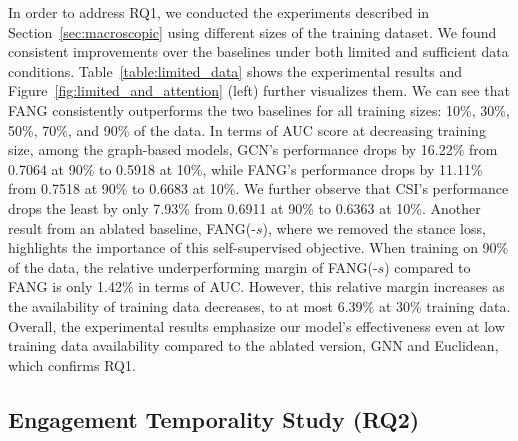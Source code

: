 \documentclass[sigconf]{acmart}
\theoremstyle{definition}
\theoremstyle{hypothesis}
\begin{document}
In order to address RQ1, we conducted the experiments described in Section~\ref{sec:macroscopic} using different sizes of the training dataset. We found consistent improvements over the baselines under both limited and sufficient data conditions.
Table~\ref{table:limited_data} shows the experimental results and Figure~\ref{fig:limited_and_attention} (left) further visualizes them. 
We can see that FANG consistently outperforms the two baselines for all training sizes: 10\%, 30\%, 50\%, 70\%, and 90\% of the data. In terms of AUC score at decreasing training size, among the graph-based models, GCN's performance drops by 16.22\% from 0.7064 at 90\% to 
0.5918 at 10\%, while FANG's performance drops by 11.11\% from 0.7518 at 90\% to 0.6683 at 10\%. We further observe that CSI's performance drops the least by only 7.93\% from 0.6911 at 90\% to 0.6363 at 10\%. 
Another result from an ablated baseline, FANG(-$s$), where we removed the stance loss, highlights the importance of this self-supervised objective. When training on 90\% of the data, the relative underperforming margin of FANG(-$s$) compared to FANG is only 1.42\% in terms of AUC. However, this relative margin increases as the availability of training data decreases, to at most 6.39\% at 30\% training data. Overall, the experimental results emphasize our model's effectiveness even at low training data availability compared to the ablated version, GNN and Euclidean, which confirms RQ1.

\subsection{Engagement Temporality Study (RQ2)} 
\end{document}
